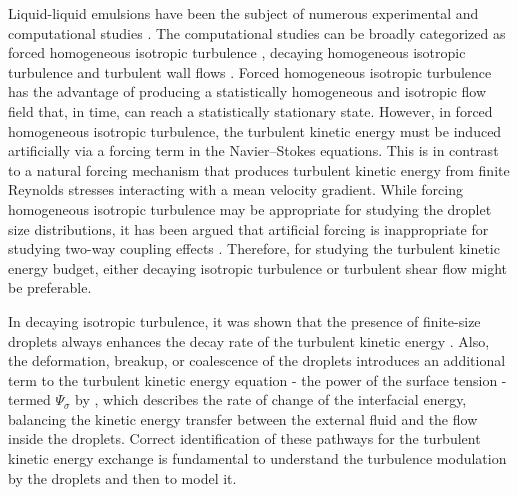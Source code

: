Liquid-liquid emulsions have been the subject of numerous experimental \citep{berkman_calabrese_1988a, pacek_man_nienow_1998a, lovick_mouza_paras_lye_angeli_2005a} and computational studies \citep{perlekar_biferale_sbragaglia_srivastava_toschi_2012a, skartlien_sollum_schumann_2013a, komrakova_eskin_derksen_2015a, scarbolo_bianco_soldati_2015a, dodd_ferrante_2016a}. The computational studies can be broadly categorized as forced homogeneous isotropic turbulence \citep{perlekar_biferale_sbragaglia_srivastava_toschi_2012a, skartlien_sollum_schumann_2013a, komrakova_eskin_derksen_2015a}, decaying homogeneous isotropic turbulence \citep{dodd_ferrante_2016a} and turbulent wall flows \citep{scarbolo_bianco_soldati_2015a}. Forced homogeneous isotropic turbulence has the advantage of producing a statistically homogeneous and isotropic flow field that, in time, can reach a statistically stationary state. However, in forced homogeneous isotropic turbulence, the turbulent kinetic energy must be induced artificially via a forcing term in the Navier--Stokes equations. This is in contrast to a natural forcing mechanism that produces turbulent kinetic energy from finite Reynolds stresses interacting with a mean velocity gradient. While forcing homogeneous isotropic turbulence may be appropriate for studying the droplet size distributions, it has been argued that artificial forcing is inappropriate for studying two-way coupling effects \citep{elghobashi_2019a}. Therefore, for studying the turbulent kinetic energy budget, either decaying isotropic turbulence or turbulent shear flow might be preferable.

In decaying isotropic turbulence, it was shown that the presence of finite-size droplets always enhances the decay rate of the turbulent kinetic energy \citep{dodd_ferrante_2016a}. Also, the deformation, breakup, or coalescence of the droplets introduces an additional term to the turbulent kinetic energy equation - the power of the surface tension - termed $\Psi_\sigma$ by \cite{dodd_ferrante_2016a}, which describes the rate of change of the interfacial energy, balancing the kinetic energy transfer between the external fluid and the flow inside the droplets. Correct identification of these pathways for the turbulent kinetic energy exchange is fundamental to understand the turbulence modulation by the droplets and then to model it.

